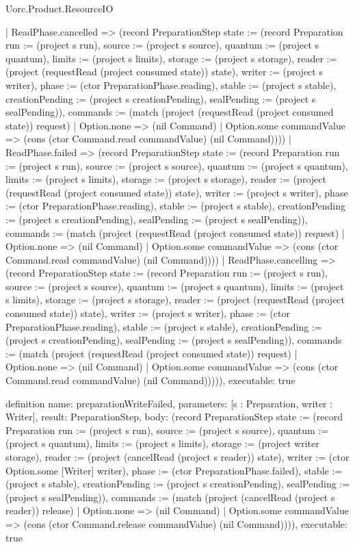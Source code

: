 \begin{lexlean}{Uorc.Product.ResourceIO}
\begin{semanticmodule}
{    | ReadPhase.cancelled => (record PreparationStep {state := (record Preparation {run := (project s run), source := (project s source), quantum := (project s quantum), limits := (project s limits), storage := (project s storage), reader := (project (requestRead (project consumed state)) state), writer := (project s writer), phase := (ctor PreparationPhase.reading), stable := (project s stable), creationPending := (project s creationPending), sealPending := (project s sealPending)}), commands := (match (project (requestRead (project consumed state)) request)
      | Option.none => (nil Command)
      | Option.some commandValue => (cons (ctor Command.read commandValue) (nil Command)))})
    | ReadPhase.failed => (record PreparationStep {state := (record Preparation {run := (project s run), source := (project s source), quantum := (project s quantum), limits := (project s limits), storage := (project s storage), reader := (project (requestRead (project consumed state)) state), writer := (project s writer), phase := (ctor PreparationPhase.reading), stable := (project s stable), creationPending := (project s creationPending), sealPending := (project s sealPending)}), commands := (match (project (requestRead (project consumed state)) request)
      | Option.none => (nil Command)
      | Option.some commandValue => (cons (ctor Command.read commandValue) (nil Command)))})
    | ReadPhase.cancelling => (record PreparationStep {state := (record Preparation {run := (project s run), source := (project s source), quantum := (project s quantum), limits := (project s limits), storage := (project s storage), reader := (project (requestRead (project consumed state)) state), writer := (project s writer), phase := (ctor PreparationPhase.reading), stable := (project s stable), creationPending := (project s creationPending), sealPending := (project s sealPending)}), commands := (match (project (requestRead (project consumed state)) request)
      | Option.none => (nil Command)
      | Option.some commandValue => (cons (ctor Command.read commandValue) (nil Command)))})),
  executable: true
}

definition{
  name: preparationWriteFailed,
  parameters: [s : Preparation, writer : Writer],
  result: PreparationStep,
  body: (record PreparationStep {state := (record Preparation {run := (project s run), source := (project s source), quantum := (project s quantum), limits := (project s limits), storage := (project writer storage), reader := (project (cancelRead (project s reader)) state), writer := (ctor Option.some [Writer] writer), phase := (ctor PreparationPhase.failed), stable := (project s stable), creationPending := (project s creationPending), sealPending := (project s sealPending)}), commands := (match (project (cancelRead (project s reader)) release)
    | Option.none => (nil Command)
    | Option.some commandValue => (cons (ctor Command.release commandValue) (nil Command)))}),
  executable: true
}


\end{semanticmodule}
\end{lexlean}
